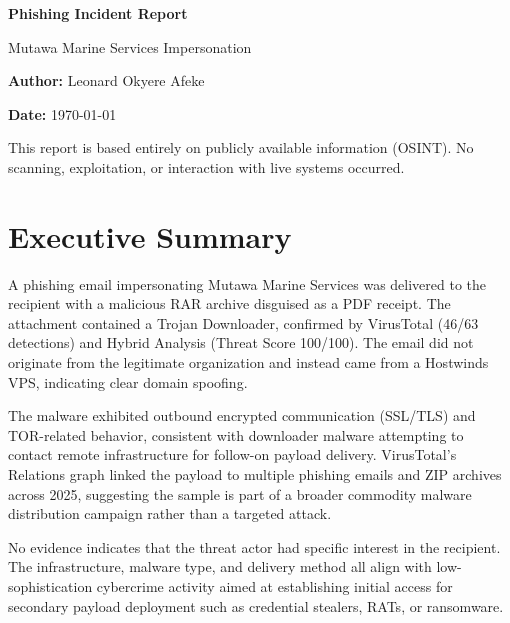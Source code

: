 \documentclass[12pt]{article}
\begin{document}
\begin{titlepage}
    \centering
    \vspace*{3cm}
    {\Huge \textbf{Phishing Incident Report}}\par
    \vspace{0.5cm}
    {\Large Mutawa Marine Services Impersonation}\par
    \vspace{1.5cm}
    
    {\large \textbf{Author:} Leonard Okyere Afeke}\par
    \vspace{0.3cm}
    {\large \textbf{Date:} \today}\par
    \vspace{2cm}
    
    \vfill
    {\small This report is based entirely on publicly available information (OSINT). 
    No scanning, exploitation, or interaction with live systems occurred.}
\end{titlepage}

\section*{Executive Summary}

A phishing email impersonating Mutawa Marine Services was delivered to the recipient with a malicious RAR archive disguised as a PDF receipt. The attachment contained a Trojan Downloader, confirmed by VirusTotal (46/63 detections) and Hybrid Analysis (Threat Score 100/100). The email did not originate from the legitimate organization and instead came from a Hostwinds VPS, indicating clear domain spoofing.

The malware exhibited outbound encrypted communication (SSL/TLS) and TOR-related behavior, consistent with downloader malware attempting to contact remote infrastructure for follow-on payload delivery. VirusTotal’s Relations graph linked the payload to multiple phishing emails and ZIP archives across 2025, suggesting the sample is part of a broader commodity malware distribution campaign rather than a targeted attack.

No evidence indicates that the threat actor had specific interest in the recipient. The infrastructure, malware type, and delivery method all align with low-sophistication cybercrime activity aimed at establishing initial access for secondary payload deployment such as credential stealers, RATs, or ransomware.
\end{document}

